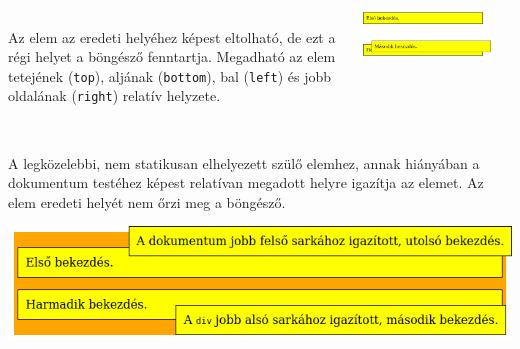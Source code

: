 \begin{frame}
  \begin{columns}[T]
      \begin{description}[m]
        \item[\texttt{relative}] \hfill \\ Az elem az eredeti helyéhez képest eltolható, de ezt a régi helyet a böngésző fenntartja. Megadható az elem tetejének (\texttt{top}), aljának (\texttt{bottom}), bal (\texttt{left}) és jobb oldalának (\texttt{right}) relatív helyzete.
      \end{description}
      \vfill
      \begin{center}
        \includegraphics[width=.75\textwidth]{relative.png}
      \end{center}
      \begin{exampleblock}{}
        \scriptsize
        
        
      \end{exampleblock}
  \end{columns}
\end{frame}

\begin{frame}
  \begin{description}[m]
    \item[\texttt{absolute}] \hfill \\ A legközelebbi, nem statikusan elhelyezett szülő elemhez, annak hiányában a dokumentum testéhez képest relatívan megadott helyre igazítja az elemet. Az elem eredeti helyét nem őrzi meg a böngésző.
  \end{description}
  \vfill
  \begin{center}
    \includegraphics[width=.6\textwidth]{absolute.png}\\
  \end{center}
\end{frame}

